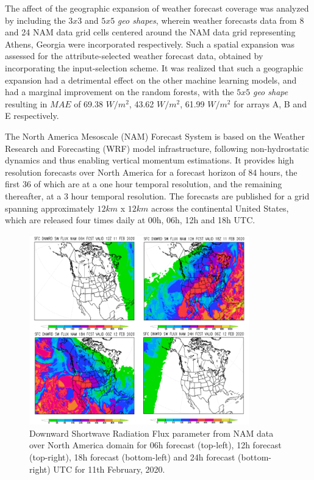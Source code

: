 \par The affect of the geographic expansion of weather forecast coverage was analyzed by including the $3 x 3$ and $5 x 5$ \textit{geo shapes}, wherein weather forecasts data from 8 and 24 NAM data grid cells centered around the NAM data grid representing Athens, Georgia were incorporated respectively. Such a spatial expansion was assessed for the attribute-selected weather forecast data, obtained by incorporating the input-selection scheme. It was realized that such a geographic expansion had a detrimental effect on the other machine learning models, and had a marginal improvement on the random forests, with the $5 x 5$ \textit{geo shape} resulting in $MAE$ of 69.38 $W/m^2$, 43.62 $W/m^2$, 61.99 $W/m^2$ for arrays A, B and E respectively.  

\par The North America Mesoscale (NAM) Forecast System is based on the Weather Research and Forecasting (WRF) model infrastructure, following non-hydrostatic dynamics and thus enabling vertical momentum estimations. It provides high resolution forecasts over North America for a forecast horizon of 84 hours, the first 36 of which are at a one hour temporal resolution, and the remaining thereafter, at a 3 hour temporal resolution. The forecasts are published for a grid spanning approximately $12km$ x $12 km$ across the continental United States, which are released four times daily at 00h, 06h, 12h and 18h UTC.

\begin{figure}[ht]
    \begin{center}
    	\includegraphics[width=0.85\textwidth]{chapter3/fig_nam_dswrf.png}
    	\caption[Downward shortwave radiation flux parameter for 06h, 12h, 18h, 24h UTC forecasts in a day for NAM model data]{Downward Shortwave Radiation Flux parameter from NAM data over North America domain for 06h forecast (top-left), 12h forecast (top-right), 18h forecast (bottom-left) and 24h forecast (bottom-right) UTC for 11th February, 2020.}
    	\label{fig:fig_nam_dswrf}
    \end{center}
\end{figure}


